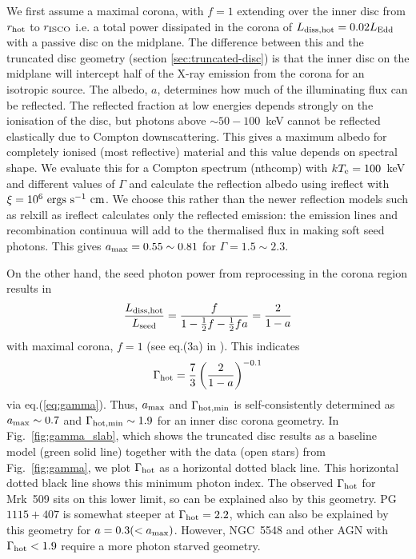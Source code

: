 \documentclass[a4paper,fleqn,usenatbib]{mnras}
\newcommand{\green}{\textcolor{green}}
\begin{document}
We first assume a
maximal corona, with $f=1$ extending
over the inner disc from $r_{\rm hot}$ to $r_{\rm ISCO}$
i.e. a total power dissipated in the corona of $L_{\rm diss, hot}=0.02L_{\rm Edd}$
with a passive disc on the midplane.
The difference between
this and the truncated disc geometry (section \ref{sec:truncated-disc}) is that the inner disc on the
midplane will intercept half of the X-ray emission from the corona for
an isotropic source. The albedo, $a$, determines how much of the
illuminating flux can be reflected. The reflected fraction at low
energies depends strongly on the ionisation of the disc, but photons
above $\sim 50-100$~keV cannot be reflected elastically due to Compton
downscattering. This gives a maximum albedo for completely ionised
(most reflective) material and this value depends on spectral
shape. %
We evaluate this for a
Compton spectrum ({\sc nthcomp}) with $kT_{\rm
e}=100$~keV and different values of $\Gamma$ and
calculate the reflection albedo using {\sc ireflect} \citep{ireflect} with
$\xi=10^6~{\rm ergs~s^{-1}~cm}$. We choose this rather than the newer reflection models
such as {\sc relxill} as {\sc ireflect} calculates only the reflected
emission: the emission lines and recombination continuua will add to
the thermalised flux in making soft seed photons.
This gives $a_{\rm max}=0.55\sim 0.81$ for $\Gamma=1.5\sim 2.3$.

On the other hand, the seed photon power from reprocessing in the corona region results
in 
\[
\frac{L_{\rm diss,hot}}{L_{\rm seed}}=\frac{f}{1-\frac{1}{2}f-\frac{1}{2}fa}=\frac{2}{1-a}
\]
with maximal corona, $f=1$ (see eq.(3a) in  \citealt{haardt1993}).
This indicates 
\[
\Gamma_{\rm hot}=\frac{7}{3}\left(\frac{2}{1-a}\right)^{-0.1}
\]
via eq.(\ref{eq:gamma}). Thus, $a_{\rm max}$ and $\Gamma_{\rm hot, min}$ is self-consistently determined as $a_{\rm max}\sim0.7$ and 
$\Gamma_{\rm hot, min}\sim 1.9$ for an inner disc corona geometry.
In Fig.~\ref{fig:gamma_slab}, which shows the truncated
disc results as a baseline model (green solid line) together with
the data (open stars) from Fig.~\ref{fig:gamma},  
we plot $\Gamma_{\rm hot}$ as a horizontal dotted black line.
This horizontal dotted black line shows this minimum photon index.
The observed $\Gamma_{\rm hot}$ for Mrk~509 sits on this lower limit, 
so can be explained also by this geometry. 
PG~$1115+407$ is somewhat steeper at $\Gamma_{\rm hot}=2.2$, which can also be explained by this geometry 
for $a=0.3 (<a_{\rm max})$.
However, NGC~5548 and other AGN with $\Gamma_{\rm hot}<1.9$ require a more photon starved geometry.
\end{document}
